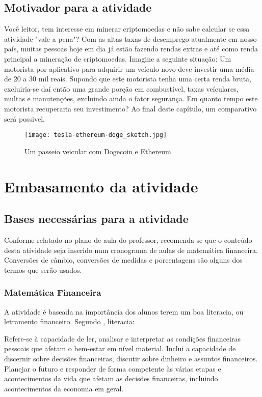 \subsection{Motivador para a atividade}
Você leitor, tem interesse em minerar criptomoedas e não sabe calcular se essa atividade "vale a pena"? Com as altas taxas de desemprego atualmente em nosso país, muitas pessoas hoje em dia já estão fazendo rendas extras e até como renda principal a mineração de criptomoedas. Imagine a seguinte situação: Um motorista por aplicativo para adquirir um veículo novo deve investir uma média de 20 a 30 mil reais. Supondo que este motorista tenha uma certa renda bruta, excluiria-se daí então uma grande porção em combustível, taxas veículares, multas e manutenções, excluindo ainda o fator segurança. Em quanto tempo este motorista recuperaria seu investimento? Ao final deste capítulo, um comparativo será possivel. \label{motiv}      

\begin{figure}[H]    
	\centering
	\caption{Um passeio veicular com Dogecoin e Ethereum}
	\texttt{[image: tesla-ethereum-doge\_sketch.jpg]}\\
\end{figure}

\section{Embasamento da atividade}
\subsection{Bases necessárias para a atividade}
Conforme relatado no plano de aula do professor, recomenda-se que o conteúdo desta atividade seja inserido num cronograma de aulas de matemática financeira. Conversões de câmbio, conversões de medidas e porcentagens são alguns dos termos que serão usados.

\subsubsection{Matemática Financeira}

A atividade é baseada na importância dos alunos terem um boa literacia, ou letramento financeiro. Segundo \cite{ORTON}, literacia: 

\begin{citacao}
		Refere-se à capacidade de ler, analisar e interpretar as condições financeiras pessoais que afetam o bem-estar em nível material. Inclui a capacidade de discernir sobre decisões financeiras, discutir sobre dinheiro e assuntos financeiros. Planejar o futuro e responder de forma competente às várias etapas e acontecimentos da vida que afetam as decisões financeiras, incluindo acontecimentos da economia em geral.
	\end{citacao}

